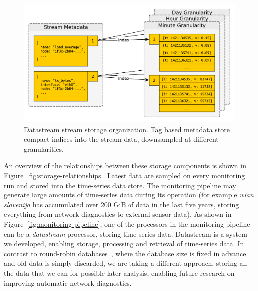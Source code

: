 \documentclass[5p,sort&compress]{elsarticle}
\newcommand{\wlanslovenija}{\textit{wlan slovenija}}
\begin{document}
\begin{figure}
  \centering
  \includegraphics[scale=0.4]{figures/datastream-storage.pdf}
  \caption{Datastream stream storage organization. Tag based metadata store compact indices into the stream data, downsampled at different granularities.}
  \label{fig:datastream-storage}
\end{figure}

An overview of the relationships between these storage components is shown in Figure~\ref{fig:storage-relationships}.
Latest data are sampled on every monitoring run and stored into the time-series data store.
The monitoring pipeline may generate large amounts of time-series data during its operation (for example \wlanslovenija{} has accumulated over 200 GiB of data in the last five years, storing everything from network diagnostics to external sensor data).
As shown in Figure~\ref{fig:monitoring-pipeline}, one of the processors in the monitoring pipeline can be a \textit{datastream} processor, storing time-series data.
Datastream is a system we developed, enabling storage, processing and retrieval of time-series data.
In contrast to round-robin databases~\cite{Oetiker_1999}, where the database size is fixed in advance and old data is simply discarded, we are taking a different approach, storing all the data that we can for possible later analysis, enabling future research on improving automatic network diagnostics.
\end{document}
